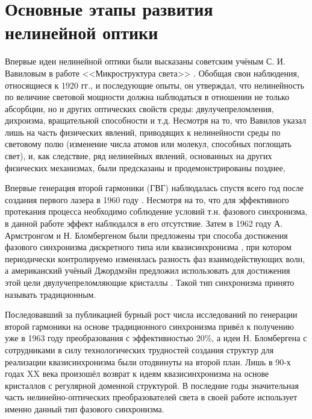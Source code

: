 \section{Основные этапы развития нелинейной оптики}\label{sec:chFiber3/fiberHist}
Впервые идеи нелинейной оптики были высказаны советским учёным С. И. Вавиловым в работе <<Микроструктура света>> \cite{vavilov1950}. Обобщая свои наблюдения, относящиеся к 1920 гг., и последующие опыты, он утверждал, что нелинейность по величине световой мощности должна наблюдаться в отношении не только абсорбции, но и других оптических свойств среды: двулучепреломления, дихроизма, вращательной способности и т.д. Несмотря на то, что Вавилов указал лишь на часть физических явлений, приводящих к нелинейности среды по световому полю (изменение числа атомов или молекул, способных поглощать свет), и, как следствие, ряд  нелинейных явлений, основанных на других физических механизмах, были предсказаны и продемонстрированы позднее, 

Впервые генерация второй гармоники (ГВГ) \cite{franken1961generation} наблюдалась спустя всего год после создания первого лазера в 1960 году \cite{maiman1960stimulated}. Несмотря на то, что для эффективного протекания процесса необходимо соблюдение условий т.н. фазового синхронизма, в данной работе эффект наблюдался в его отсутствие. Затем в 1962 году А. Армстронгом и Н. Бломбергеном  были предложены три способа достижения фазового синхронизма дискретного типа или \textsf{квазисинхронизма} \cite{armstrong1962interactions}, при котором периодически контролируемо изменялась разность фаз взаимодействующих волн, а американский учёный Джордмэйн предложил использовать для достижения этой цели двулучепреломляющие кристаллы \cite{giordmaine1962mixing}. Такой тип синхронизма принято называть \textsf{традиционным}. 

Последовавший за публикацией \cite{giordmaine1962mixing} бурный рост числа исследований по генерации второй гармоники на основе традиционного синхронизма привёл к получению уже в 1963 году преобразования с эффективностью 20\%, а идеи Н. Бломбергена с сотрудниками в силу технологических трудностей создания структур для реализации квазисинхронизма были отодвинуты на второй план. Лишь в 90-х годах XX века произошёл возврат к идеям квазисинхронизма на основе кристаллов с регулярной доменной структурой. В последние годы значительная часть нелинейно-оптических преобразователей света в своей работе использует именно данный тип фазового синхронизма.

